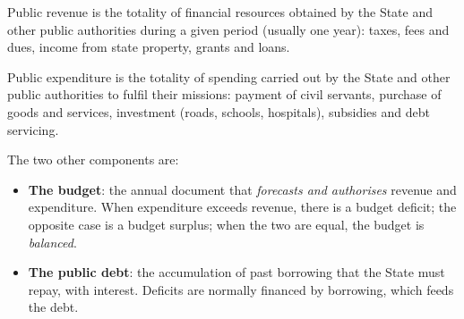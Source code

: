 \documentclass[11pt]{article}
\newcommand{\cle}[1]{{\popxbold\color{popdark}#1}}
\begin{document}
\begin{definition}
\cle{Public revenue} is the totality of financial resources obtained by the State and other public authorities during a given period (usually one year): taxes, fees and dues, income from state property, grants and loans.

\cle{Public expenditure} is the totality of spending carried out by the State and other public authorities to fulfil their missions: payment of civil servants, purchase of goods and services, investment (roads, schools, hospitals), subsidies and debt servicing.
\end{definition}

The two other components are:
\begin{itemize}
\item \textbf{The budget}: the annual document that \emph{forecasts and authorises} revenue and expenditure. When expenditure exceeds revenue, there is a \cle{budget deficit}; the opposite case is a \cle{budget surplus}; when the two are equal, the budget is \emph{balanced}.
\item \textbf{The public debt}: the accumulation of past borrowing that the State must repay, with interest. Deficits are normally financed by borrowing, which feeds the debt.
\end{itemize}
\end{document}
